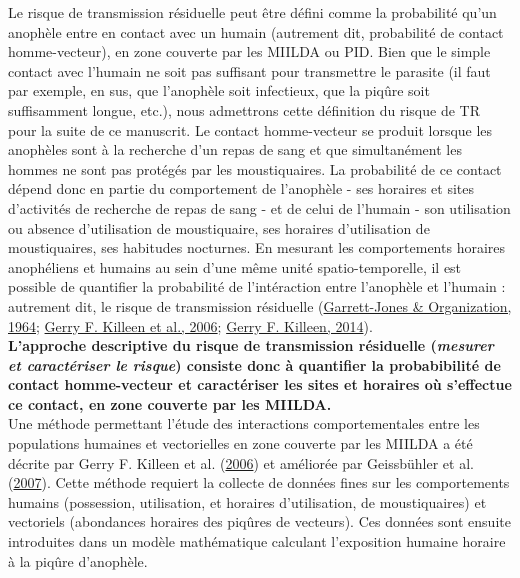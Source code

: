 \documentclass[12pt,twoside]{reedthesis}
\begin{document}
Le risque de transmission résiduelle peut être défini comme la probabilité qu'un anophèle entre en contact avec un humain (autrement dit, probabilité de contact homme-vecteur), en zone couverte par les MIILDA ou PID. Bien que le simple contact avec l'humain ne soit pas suffisant pour transmettre le parasite (il faut par exemple, en sus, que l'anophèle soit infectieux, que la piqûre soit suffisamment longue, etc.), nous admettrons cette définition du risque de TR pour la suite de ce manuscrit. Le contact homme-vecteur se produit lorsque les anophèles sont à la recherche d'un repas de sang et que simultanément les hommes ne sont pas protégés par les moustiquaires. La probabilité de ce contact dépend donc en partie du comportement de l'anophèle - ses horaires et sites d'activités de recherche de repas de sang - et de celui de l'humain - son utilisation ou absence d'utilisation de moustiquaire, ses horaires d'utilisation de moustiquaires, ses habitudes nocturnes. En mesurant les comportements horaires anophéliens et humains au sein d'une même unité spatio-temporelle, il est possible de quantifier la probabilité de l'intéraction entre l'anophèle et l'humain : autrement dit, le risque de transmission résiduelle (\protect\hyperlink{ref-Garrett-Jones_1964}{Garrett-Jones \& Organization, 1964}; \protect\hyperlink{ref-killeen_quantifying_2006}{Gerry F. Killeen et al., 2006}; \protect\hyperlink{ref-killeen_characterizing_2014}{Gerry F. Killeen, 2014}).\\

\textbf{L'approche descriptive du risque de transmission résiduelle (\emph{mesurer et caractériser le risque}) consiste donc à quantifier la probabibilité de contact homme-vecteur et caractériser les sites et horaires où s'effectue ce contact, en zone couverte par les MIILDA.}\\

Une méthode permettant l'étude des interactions comportementales entre les populations humaines et vectorielles en zone couverte par les MIILDA a été décrite par Gerry F. Killeen et al. (\protect\hyperlink{ref-killeen_quantifying_2006}{2006}) et améliorée par Geissbühler et al. (\protect\hyperlink{ref-geissbuhler_interdependence_2007}{2007}). Cette méthode requiert la collecte de données fines sur les comportements humains (possession, utilisation, et horaires d'utilisation, de moustiquaires) et vectoriels (abondances horaires des piqûres de vecteurs). Ces données sont ensuite introduites dans un modèle mathématique calculant l'exposition humaine horaire à la piqûre d'anophèle.\\
\end{document}
